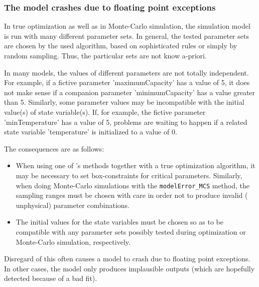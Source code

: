 \subsubsection*{The model crashes due to floating point exceptions}

In true optimization as well as in Monte-Carlo simulation, the simulation model is run with many different parameter sets. In general, the tested parameter sets are chosen by the used algorithm, based on sophisticated rules or simply by random sampling. Thus, the particular sets are not know a-priori.

In many models, the values of different parameters are not totally independent. For example, if a fictive parameter 'maximumCapacity' has a value of 5, it does not make sense if a companion parameter 'minimumCapacity' has a value greater than 5. Similarly, some parameter values may be incompatible with the initial value(s) of state variable(s). If, for example, the fictive parameter 'minTemperature' has a value of 5, problems are waiting to happen if a related state variable 'temperature' is initialized to a value of 0.

The consequences are as follows:
\begin{itemize}
  \item When using one of 's methods together with a true optimization algorithm, it may be necessary to set box-constraints for critical parameters. Similarly, when doing Monte-Carlo simulations with the \texttt{modelError\_MCS} method, the sampling ranges must be chosen with care in order not to produce invalid (\eg{} unphysical) parameter combinations.
  \item The initial values for the state variables must be chosen so as to be compatible with any parameter sets possibly tested during optimization or Monte-Carlo simulation, respectively.
\end{itemize}

Disregard of this often causes a model to crash due to floating point exceptions. In other cases, the model only produces implausible outputs (which are hopefully detected because of a bad fit).


